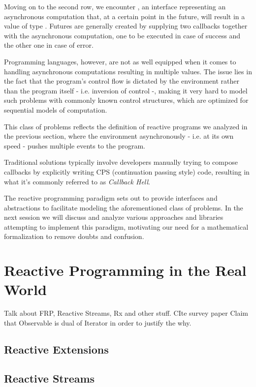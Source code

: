 Moving on to the second row, we encounter , an interface representing an asynchronous computation that, at a certain point in the future, will result in a value of type . Futures are generally created by supplying two callbacks together with the asynchronous computation, one to be executed in case of success and the other one in case of error. 

Programming languages, however, are not as well equipped when it comes to handling asynchronous computations resulting in multiple values. The issue lies in the fact that the program's control flow is dictated by the environment rather than the program itself - i.e. inversion of control -, making it very hard to model such problems with commonly known control structures, which are optimized for sequential models of computation.

This class of problems reflects the definition of reactive programs we analyzed in the previous section, where the environment asynchronously - i.e. at its own speed - pushes multiple events to the program. 

Traditional solutions typically involve developers manually trying to compose callbacks by explicitly writing CPS (continuation passing style) code\cite{meijer2015spicing}, resulting in what it's commonly referred to as \textit{Callback Hell}\cite{edwards2009coherent}.

The reactive programming paradigm sets out to provide interfaces and abstractions to facilitate modeling the aforementioned class of problems. In the next session we will discuss and analyze various approaches and libraries attempting to implement this paradigm, motivating our need for a mathematical formalization to remove doubts and confusion. 


\section{Reactive Programming in the Real World}

Talk about FRP, Reactive Streams, Rx and other stuff. CIte survey paper
Claim that Observable is dual of Iterator in order to justify the why.

\subsection{Reactive Extensions}
\subsection{Reactive Streams}
